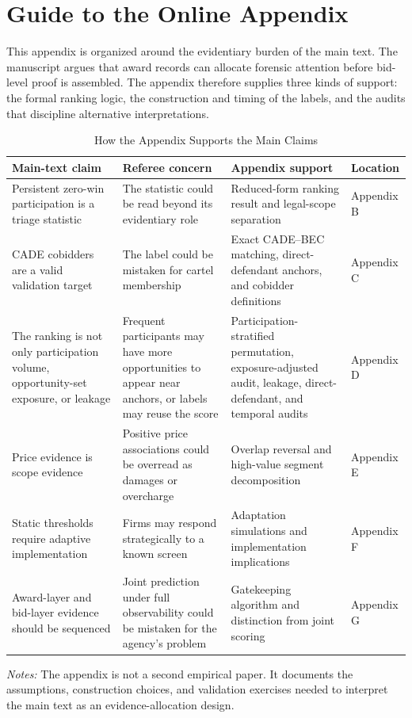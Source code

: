 \section{Guide to the Online Appendix}
\label{app:guide_submission}

This appendix is organized around the evidentiary burden of the
main text. The manuscript argues that award records can allocate
forensic attention before bid-level proof is assembled. The
appendix therefore supplies three kinds of support: the formal
ranking logic, the construction and timing of the labels, and the
audits that discipline alternative interpretations.

\begin{table}[htbp]
\centering
\caption{How the Appendix Supports the Main Claims}
\label{tab:appendix_map_submission}
\footnotesize
\begin{adjustbox}{max width=\textwidth,center}
\begin{threeparttable}
\begin{tabular}{L{3.9cm}L{4.4cm}L{4.6cm}L{3.1cm}}
\toprule
Main-text claim & Referee concern & Appendix support & Location \\
\midrule
Persistent zero-win participation is a triage statistic &
The statistic could be read beyond its evidentiary role &
Reduced-form ranking result and legal-scope separation &
Appendix B \\
CADE cobidders are a valid validation target &
The label could be mistaken for cartel membership &
Exact CADE--BEC matching, direct-defendant anchors, and cobidder definitions &
Appendix C \\
The ranking is not only participation volume, opportunity-set exposure, or leakage &
Frequent participants may have more opportunities to appear near anchors, or labels may reuse the score &
Participation-stratified permutation, exposure-adjusted audit, leakage, direct-defendant, and temporal audits &
Appendix D \\
Price evidence is scope evidence &
Positive price associations could be overread as damages or overcharge &
Overlap reversal and high-value segment decomposition &
Appendix E \\
Static thresholds require adaptive implementation &
Firms may respond strategically to a known screen &
Adaptation simulations and implementation implications &
Appendix F \\
Award-layer and bid-layer evidence should be sequenced &
Joint prediction under full observability could be mistaken for the agency's problem &
Gatekeeping algorithm and distinction from joint scoring &
Appendix G \\
\bottomrule
\end{tabular}
\begin{tablenotes}
\footnotesize
\item \textit{Notes:} The appendix is not a second empirical
paper. It documents the assumptions, construction choices, and
validation exercises needed to interpret the main text as an
evidence-allocation design.
\end{tablenotes}
\end{threeparttable}
\end{adjustbox}
\end{table}
